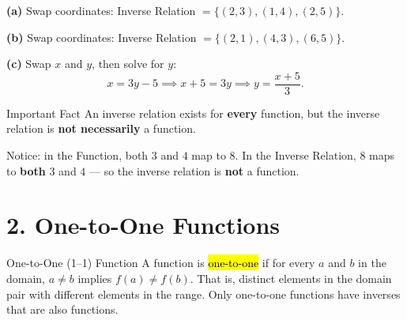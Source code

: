 \documentclass[12pt]{article}
\newcommand{\funhl}[1]{\sethlcolor{highlight}\hl{#1}}
\begin{document}
\begin{solutionbox}
\textbf{(a)} Swap coordinates: Inverse Relation $=\{(2,3),(1,4),(2,5)\}$.

\textbf{(b)} Swap coordinates: Inverse Relation $=\{(2,1),(4,3),(6,5)\}$.

\textbf{(c)} Swap $x$ and $y$, then solve for $y$:
\[
x=3y-5 \implies x+5=3y \implies y=\frac{x+5}{3}.
\]
\end{solutionbox}

\begin{friendlyrule}{Important Fact}
An inverse relation exists for \textbf{every} function, but the inverse relation is \textbf{not necessarily} a function.
\end{friendlyrule}

\begin{center}
\end{center}

Notice: in the Function, both $3$ and $4$ map to $8$. In the Inverse Relation, $8$ maps to \textbf{both} $3$ and $4$ --- so the inverse relation is \textbf{not} a function.

\section*{2. One-to-One Functions}

\begin{friendlyrule}{One-to-One (1--1) Function}
A function is \funhl{one-to-one} if for every $a$ and $b$ in the domain, $a\neq b$ implies $f(a)\neq f(b)$. That is, distinct elements in the domain pair with different elements in the range. Only one-to-one functions have inverses that are also functions.
\end{friendlyrule}
\end{document}
